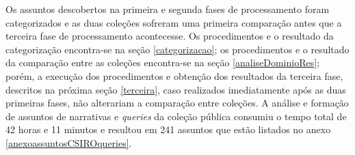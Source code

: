 Os assuntos descobertos na primeira e segunda fases de processamento foram categorizados e as duas coleções sofreram uma primeira comparação antes que a terceira fase de processamento acontecesse. Os procedimentos e o resultado da categorização encontra-se na seção \ref{categorizacao}; os procedimentos e o resultado da comparação entre as coleções encontra-se na seção \ref{analiseDominioRes}; porém, a execução dos procedimentos e obtenção dos resultados da terceira fase, descritos na próxima seção \ref{terceira}, caso realizados imediatamente após as duas primeiras fases, não alterariam a comparação entre coleções. A análise e formação de assuntos de narrativas e \textit{queries} da coleção pública consumiu o tempo total de 42 horas e 11 minutos e resultou em 241 assuntos que estão listados no anexo \ref{anexoassuntosCSIROqueries}. 







